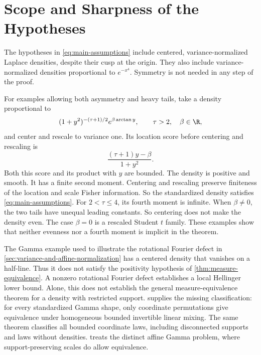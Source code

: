 \section{Scope and Sharpness of the Hypotheses}
\label{sec:scope-and-sharpness-of-the-hypotheses}

The hypotheses in \eqref{eq:main-assumptions} include centered,
variance-normalized Laplace densities, despite their cusp at the origin.
They also include variance-normalized densities proportional to $e^{-x^4}$.
Symmetry is not needed in any step of the proof.

For examples allowing both asymmetry and heavy tails, take a density
proportional to
\begin{equation}
 (1+y^2)^{-(\tau+1)/2}
                           e^{\beta\arctan y},
 \qquad \tau>2,\quad \beta\in\R,
 \label{eq:asymmetric-heavy-tail-example}
\end{equation}
and center and rescale to variance one.
Its location score before centering and rescaling is
\[
 \frac{(\tau+1)y-\beta}{1+y^2}.
\]
Both this score and its product with $y$ are bounded.
The density is positive and smooth.
It has a finite second moment.
Centering and rescaling preserve finiteness of the location and scale
Fisher information.
So the standardized density satisfies \eqref{eq:main-assumptions}.
For \(2<\tau\le4\), its fourth moment is infinite.
When \(\beta\ne0\), the two tails have unequal leading constants.
So centering does not make the density even.
The case \(\beta=0\) is a rescaled Student $t$ family.
These examples show that neither evenness nor a fourth moment is implicit in
the theorem.

The Gamma example used to illustrate the rotational Fourier defect in
\cref{sec:variance-and-affine-normalization} has a centered density that vanishes on
a half-line.
Thus it does not satisfy the positivity hypothesis of
\cref{thm:measure-equivalence}.
A nonzero rotational Fourier defect establishes a local Hellinger lower bound.
Alone, this does not establish the general measure-equivalence theorem for a
density with restricted support.
 supplies the missing classification:
for every standardized Gamma shape, only coordinate permutations give
equivalence under homogeneous bounded invertible linear mixing.
The same theorem classifies all bounded coordinate laws, including
disconnected supports and laws without densities.
 treats the distinct affine Gamma
problem, where support-preserving scales do allow equivalence.

